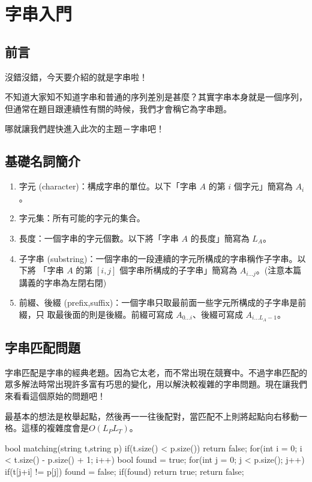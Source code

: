 \chapter{字串入門}

\section{前言}
沒錯沒錯，今天要介紹的就是字串啦！

不知道大家知不知道字串和普通的序列差別是甚麼？其實字串本身就是一個序列，但通常在題目跟連續性有關的時候，我們才會稱它為字串題。

哪就讓我們趕快進入此次的主題－字串吧！
\section{基礎名詞簡介}
\begin{enumerate}
\item 字元 (character)：構成字串的單位。以下「字串 $A$ 的第 $i$ 個字元」簡寫為 $A_i$。
\item 字元集：所有可能的字元的集合。
\item 長度：一個字串的字元個數。以下將「字串 $A$ 的長度」簡寫為 $L_A$。
\item 子字串 (substring)：一個字串的一段連續的字元所構成的字串稱作子字串。以下將
「字串 $A$ 的第 $[i, j]$ 個字串所構成的子字串」簡寫為 $A_{i...j}$。(注意本篇講義的字串為左閉右閉)
\item 前綴、後綴 (prefix,suffix)：一個字串只取最前面一些字元所構成的子字串是前綴，只
取最後面的則是後綴。前綴可寫成 $A_{0...i}$、後綴可寫成 $A_{i...L_A-1}$。
\end{enumerate}

\section{字串匹配問題}
字串匹配是字串的經典老題。因為它太老，而不常出現在競賽中。不過字串匹配的眾多解法時常出現許多富有巧思的變化，用以解決較複雜的字串問題。現在讓我們來看看這個原始的問題吧！\\


最基本的想法是枚舉起點，然後再一一往後配對，當匹配不上則將起點向右移動一格。這樣的複雜度會是$O(L_P L_T)$。\\

\begin{C++}
bool matching(string t,string p){
    if(t.size() < p.size()) return false;
    for(int i = 0; i < t.size() - p.size() + 1; i++){
        bool found = true;
        for(int j = 0; j < p.size(); j++)
            if(t[j+i] != p[j]) found = false;
        if(found) return true;
    }
    return false;
}
\end{C++}


